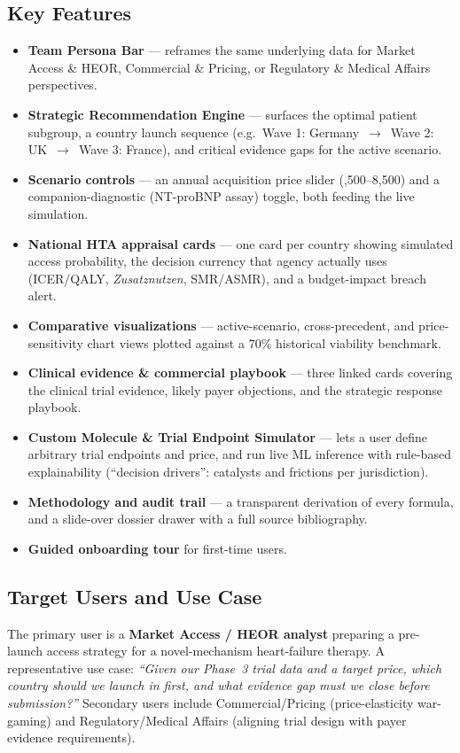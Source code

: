 \documentclass[11pt,a4paper]{article}
\begin{document}
\subsection{Key Features}
\begin{itemize}[leftmargin=1.3em]
  \item \textbf{Team Persona Bar} --- reframes the same underlying data for Market Access \&
  HEOR, Commercial \& Pricing, or Regulatory \& Medical Affairs perspectives.
  \item \textbf{Strategic Recommendation Engine} --- surfaces the optimal patient subgroup, a
  country launch sequence (e.g.\ Wave 1: Germany~$\to$~Wave 2: UK~$\to$~Wave 3: France), and
  critical evidence gaps for the active scenario.
  \item \textbf{Scenario controls} --- an annual acquisition price slider (,500--8,500)
  and a companion-diagnostic (NT-proBNP assay) toggle, both feeding the live simulation.
  \item \textbf{National HTA appraisal cards} --- one card per country showing simulated access
  probability, the decision currency that agency actually uses (ICER/QALY, \emph{Zusatznutzen},
  SMR/ASMR), and a budget-impact breach alert.
  \item \textbf{Comparative visualizations} --- active-scenario, cross-precedent, and
  price-sensitivity chart views plotted against a 70\% historical viability benchmark.
  \item \textbf{Clinical evidence \& commercial playbook} --- three linked cards covering the
  clinical trial evidence, likely payer objections, and the strategic response playbook.
  \item \textbf{Custom Molecule \& Trial Endpoint Simulator} --- lets a user define arbitrary
  trial endpoints and price, and run live ML inference with rule-based explainability
  (``decision drivers'': catalysts and frictions per jurisdiction).
  \item \textbf{Methodology and audit trail} --- a transparent derivation of every formula, and a
  slide-over dossier drawer with a full source bibliography.
  \item \textbf{Guided onboarding tour} for first-time users.
\end{itemize}

\subsection{Target Users and Use Case}
The primary user is a \textbf{Market Access / HEOR analyst} preparing a pre-launch access strategy
for a novel-mechanism heart-failure therapy. A representative use case: \emph{``Given our Phase~3
trial data and a target price, which country should we launch in first, and what evidence gap must
we close before submission?''} Secondary users include Commercial/Pricing (price-elasticity
war-gaming) and Regulatory/Medical Affairs (aligning trial design with payer evidence
requirements).
\end{document}
